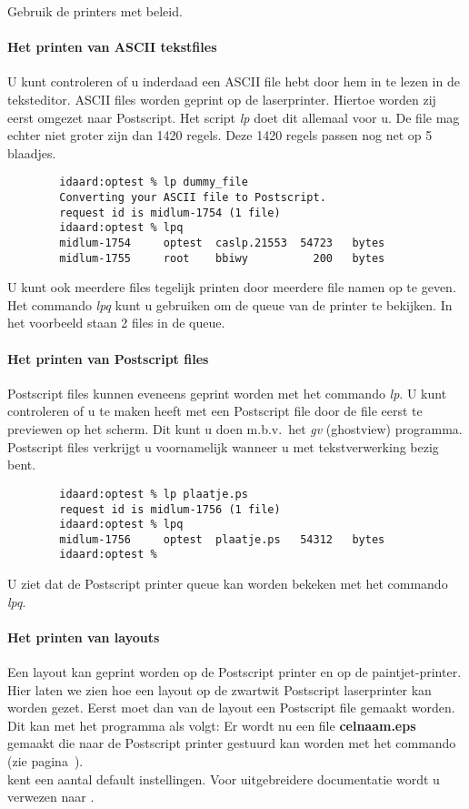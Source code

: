 Gebruik de printers met beleid. 

\paragraph{Het printen van ASCII tekstfiles}
U kunt controleren of u inderdaad een ASCII file hebt
door hem in te lezen in de teksteditor.
ASCII files worden geprint op de laserprinter.
Hiertoe worden zij eerst omgezet naar Postscript.
Het script {\em lp} doet dit allemaal voor u.
De file mag echter niet groter zijn dan 1420 regels.
Deze 1420 regels passen nog net op 5 blaadjes.
\begin{verbatim}
        idaard:optest % lp dummy_file
        Converting your ASCII file to Postscript.
        request id is midlum-1754 (1 file)
        idaard:optest % lpq
        midlum-1754     optest  caslp.21553  54723   bytes
        midlum-1755     root    bbiwy          200   bytes
\end{verbatim}
U kunt ook meerdere files tegelijk printen
door meerdere file namen op te geven.
Het commando {\em lpq} kunt u gebruiken om de queue van de
printer te bekijken.
In het voorbeeld staan 2 files in de queue.

\paragraph{Het printen van Postscript files}
\label{lp}
Postscript files kunnen eveneens geprint worden met het commando {\em lp}.
U kunt controleren of u te maken heeft met een Postscript file
door de file eerst te previewen op het scherm.
Dit kunt u doen m.b.v.\ het {\em gv} (ghostview) programma. 
Postscript files verkrijgt u voornamelijk wanneer u met tekstverwerking
bezig bent.
\begin{verbatim}
        idaard:optest % lp plaatje.ps
        request id is midlum-1756 (1 file)
        idaard:optest % lpq
        midlum-1756     optest  plaatje.ps   54312   bytes
        idaard:optest % 
\end{verbatim} 
U ziet dat de Postscript printer queue kan worden bekeken met
het commando {\em lpq}.

\paragraph{Het printen van layouts}
Een layout kan geprint worden op de Postscript printer
en op de paintjet-printer.
Hier laten we zien hoe een layout op de zwartwit Postscript laserprinter
kan worden gezet.
Eerst moet dan van de layout een Postscript file gemaakt worden.
Dit kan met het programma  als volgt:
Er wordt nu een file {\bf celnaam.eps} gemaakt die naar de 
Postscript printer gestuurd kan worden met het commando 
 (zie pagina~\pageref{lp}).\\
 kent een aantal default instellingen.
Voor uitgebreidere
documentatie wordt u verwezen naar .

